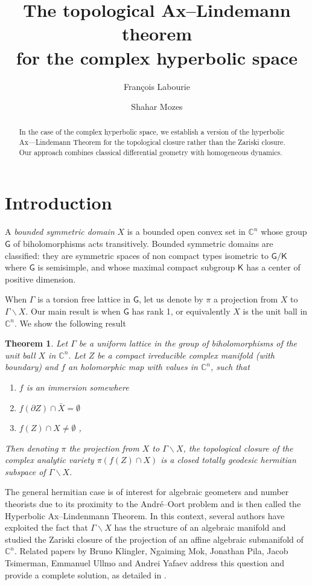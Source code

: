 \documentclass[12pt,reqno]{amsart}
\title{The topological  Ax--Lindemann theorem\\ for the complex hyperbolic space}
\author[F. Labourie]{Fran\c cois Labourie}
\author[S. Mozes]{Shahar Mozes}
\newcommand{\mG}{\ms G}
\newcommand{\ms}{\mathsf}
\newcommand{\mK}{\mathsf K}
\newcounter{foo}
\newtheorem{theo}[foo]{Theorem}
\begin{document}
\renewcommand{\theenumi}{(\roman{enumi})}%
\maketitle
\begin{abstract}
	In the case of the complex hyperbolic space, we establish a version of the hyperbolic Ax—Lindemann Theorem for the topological closure rather than the Zariski closure.  Our approach combines classical differential geometry with homogeneous dynamics.
\end{abstract}
\section*{Introduction}
A {\em bounded symmetric domain} $X$ is a bounded open convex set in $\mathbb C^n$ whose group $\mG$ of biholomorphisms acts transitively. Bounded symmetric domains are classified: they are symmetric spaces of non compact types isometric to $\mG/\mK$ where $\mG$ is semisimple, and whose maximal compact subgroup $\mK$ has a center of positive dimension.

When $\Gamma$ is a torsion free lattice in $\mG$, let us denote by $\pi$  a projection from $X$ to $\Gamma\backslash X$. Our main result is when $\mG$ has rank 1, or equivalently $X$ is the unit ball in $\mathbb C^n$. We show the following result

\begin{theo} Let $\Gamma$ be a uniform lattice in the group of biholomorphisms of the unit ball $X$ in $\mathbb C^n$. Let $Z$ be a compact irreducible complex manifold (with boundary) and $f$ an holomorphic map with values in $\mathbb C^n$, such that 
	\begin{enumerate}
		\item $f$ is an immersion somewhere
		\item $f(\partial Z)\cap \bar X=\emptyset$
		\item $f(Z)\cap X\not=\emptyset$ , 
	\end{enumerate}
	Then denoting $\pi$ the projection from $X$ to $\Gamma\backslash X$, the topological closure of the complex analytic variety  $\pi(f(Z)\cap X)$ is a closed totally geodesic hermitian subspace of $\Gamma\backslash X$.
\end{theo} 



The general  hermitian case is of  interest for algebraic geometers and number theorists due to its proximity to the André--Oort problem and is then called the Hyperbolic Ax--Lindenmann Theorem. In this context, several authors have exploited  the fact that \(\Gamma \backslash X\) has the structure of an algebraic manifold and studied the Zariski closure of the projection of an affine algebraic submanifold of \(\mathbb{C}^n\).  Related papers by Bruno Klingler, Ngaiming Mok, Jonathan Pila,  Jacob Tsimerman, Emmanuel Ullmo and Andrei Yafaev address this question and provide a complete solution, as detailed in \cite{Ullmo:2014aa,Klingler:2016aa,Mok:2019aa}. 
\end{document}
